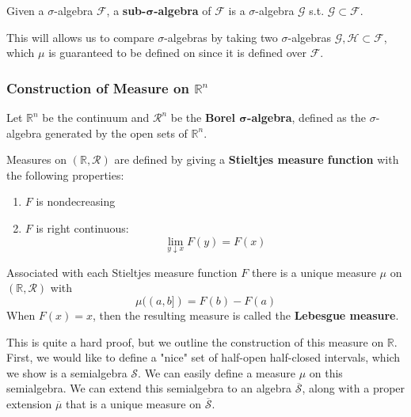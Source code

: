   \begin{definition}
    Given a $\sigma$-algebra $\mathcal{F}$, a \textbf{sub-$\boldsymbol{\sigma}$-algebra} of $\mathcal{F}$ is a $\sigma$-algebra $\mathcal{G}$ s.t. $\mathcal{G} \subset \mathcal{F}$. 
  \end{definition}

  This will allows us to compare $\sigma$-algebras by taking two $\sigma$-algebras $\mathcal{G}, \mathcal{H} \subset \mathcal{F}$, which $\mu$ is guaranteed to be defined on since it is defined over $\mathcal{F}$. 

  \subsubsection[Construction of Measure on Rn]{Construction of Measure on $\mathbb{R}^n$}

  Let $\mathbb{R}^n$ be the continuum and $\mathcal{R}^n$ be the \textbf{Borel $\boldsymbol{\sigma}$-algebra}, defined as the $\sigma$-algebra generated by the open sets of $\mathbb{R}^n$. 

  \begin{example}
    Measures on $(\mathbb{R}, \mathcal{R})$ are defined by giving a \textbf{Stieltjes measure function} with the following properties: 
    \begin{enumerate}
      \item $F$ is nondecreasing 
      \item $F$ is right continuous: 
      \begin{equation}
        \lim_{y \downarrow x} F(y) = F(x)
      \end{equation}
    \end{enumerate}
  \end{example}

  \begin{theorem}
    Associated with each Stieltjes measure function $F$ there is a unique measure $\mu$ on $(\mathbb{R}, \mathcal{R})$ with 
    \begin{equation}
      \mu((a, b]) = F(b) - F(a)
    \end{equation}
    When $F(x) = x$, then the resulting measure is called the \textbf{Lebesgue measure}. 
  \end{theorem}

  This is quite a hard proof, but we outline the construction of this measure on $\mathbb{R}$. First, we would like to define a "nice" set of half-open half-closed intervals, which we show is a semialgebra $\mathcal{S}$. We can easily define a measure $\mu$ on this semialgebra. We can extend this semialgebra to an algebra $\overline{\mathcal{S}}$, along with a proper extension $\overline{\mu}$ that is a unique measure on $\overline{\mathcal{S}}$. 

